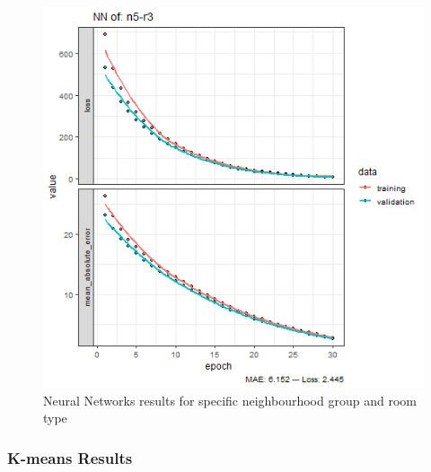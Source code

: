 \documentclass{FR16}
\begin{document}
\begin{figure}[!htb]
\begin{minipage}{0.33\textwidth}
   \end{minipage}
   \begin{minipage}{0.33\textwidth}
     \centering
     \includegraphics[width=1\linewidth]{figures/NN-n5-r3.png} 
   \end{minipage}\hfill
           \caption{Neural Networks results for specific neighbourhood group and room type}\label{fig:21}

\end{figure}





\newpage
\noindent \subsubsection{K-means Results}
\end{document}
